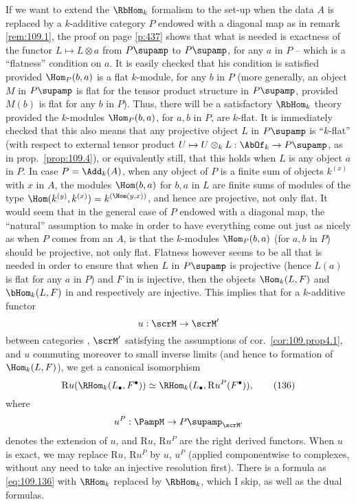 \begin{remarks}
  \enspace If we want to extend the
  $\RbHom_k$ formalism to the set-up when the data $A$ is replaced by
  a $k$-additive category $P$ endowed with a diagonal map as in remark
  \ref{rem:109.1}, the proof on page \ref{p:437} shows that what is
  needed is exactness of the functor $L\mapsto L\otimes a$
  from $P\supamp$ to $P\supamp$, for any $a$ in $P$ -- which is a
  ``flatness'' condition on $a$. It is easily checked that his
  condition is satisfied provided $\Hom_P(b,a)$ is a flat $k$-module,
  for any $b$ in $P$ (more generally, an object $M$ in $P\supamp$ is
  flat for the tensor product structure in $P\supamp$, provided $M(b)$
  is flat for any $b$ in $P$). Thus, there will be a satisfactory
  $\RbHom_k$ theory provided the $k$-modules $\Hom_P(b,a)$, for $a,b$
  in $P$, are $k$-flat. It is immediately checked that this also means
  that any projective object $L$ in $P\supamp$ is ``$k$-flat'' (with
  respect to external tensor product $U\mapsto U\otimes_k L :
  \AbOf_k\to P\supamp$, as in prop.\ \ref{prop:109.4}), or
  equivalently still, that this holds when $L$ is any object $a$ in
  $P$. In case $P=\Add_k(A)$, when any object of $P$ is a finite sum
  of objects $k^{(x)}$ with $x$ in $A$, the modules $\Hom(b,a)$ for
  $b,a$ in $L$ are finite sums of modules of the type
  $\Hom(k^{(y)},k^{(x)})=k^{(\Hom(y,x))}$, and hence are projective,
  not only flat. It would seem that in the general case of $P$ endowed
  with a diagonal map, the ``natural'' assumption to make in order to
  have everything come out just as nicely as when $P$ comes from an
  $A$, is that the $k$-modules $\Hom_P(b,a)$ (for $a,b$ in $P$) should
  be projective, not only flat. Flatness however seems to be all that
  is needed in order to ensure that when $L$ in $P\supamp$ is
  projective (hence $L(a)$ is flat for any $a$ in $P$) and $F$ in
  \PampM{} is injective, then the objects $\Hom_k(L,F)$ and
  $\bHom_k(L,F)$ in \scrM{} and \PampM{} respectively are
  injective. This implies that for a $k$-additive functor
  \[u:\scrM\to\scrM'\]
  between categories \scrM, $\scrM'$ satisfying the assumptions of
  cor.\ \ref{cor:109.prop4.1}, and $u$ commuting moreover to small
  inverse limits (and hence to formation of $\Hom_k(L,F)$), we get a
  canonical isomorphism
  \begin{equation}
    \label{eq:109.136}
    \mathrm R u (\RHom_k(L_\bullet,F^\bullet)) \simeq
    \RHom_k(L_\bullet,\mathrm Ru^P(F^\bullet)),\tag{136}
  \end{equation}
  where
  \[u^P:\PampM\to P\supamp_{\scrM'}\]
  denotes the extension of $u$, and $\mathrm Ru$, $\mathrm Ru^P$ are
  the right derived functors. When $u$ is exact, we may replace
  $\mathrm Ru$, $\mathrm Ru^P$ by $u$, $u^P$ (applied componentwise to
  complexes, without any need to take an injective resolution
  first). There is a formula as \eqref{eq:109.136} with $\RHom_k$
  replaced by $\RbHom_k$, which I skip, as well as the dual formulas.
\end{remarks}

